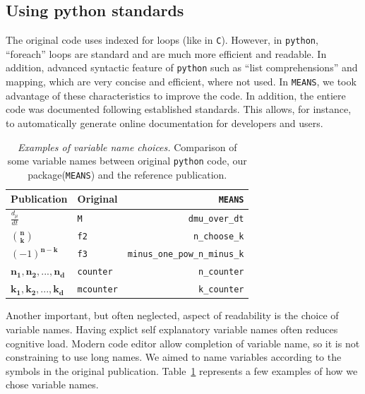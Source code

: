 \documentclass[11pt,a4paper]{article}
\newcommand{\means}{\texttt{MEANS}}
\newcommand{\py}{\texttt{python}}
\begin{document}
\subsection{Using python standards}
The original code uses indexed for loops (like in \texttt{C}).
However, in \py, ``foreach'' loops are  standard and are much more efficient and readable.
In addition, advanced syntactic feature of \py{} such as ``list comprehensions''  and mapping,
which are very concise and efficient, where not used.
In \means, we took advantage of these characteristics to improve the code.
In addition, the entiere code was documented following established standards.
This allows, for instance, to automatically generate online documentation for developers and users.



\begin{table}
\caption{\emph{Examples of variable name choices.}
Comparison of some  variable names between original \py{} code, our package(\means) and the reference publication.
}

\begin{center}   
	\begin{tabular}{ | l | l | r|}
	\hline
	\bf{Publication\cite{ale_general_2013}} & \bf{Original} & \bf{\means}\\
	\hline
	\hline
	$\frac{d_{\mu}}{dt}$ & \verb"M" & \verb"dmu_over_dt"\\
	\hline
	$\mathbf{n\choose{k}}$ & \verb"f2" & \verb"n_choose_k"\\
	\hline
	$ (-1)^\mathbf{{n-k}}$ & \verb"f3" & \verb"minus_one_pow_n_minus_k"\\
	\hline
	$\mathbf{n_1    , n_2, ..., n_d}$ & \verb"counter" & \verb"n_counter"\\
	\hline
	$\mathbf{k_1, k_2, ..., k_d}$ & \verb"mcounter" & \verb"k_counter"\\
	\hline
	\end{tabular}
\end{center}
\label{tab:varnames}
\end{table}

Another important, but often neglected, aspect of readability is the choice of variable names.
Having explict self explanatory variable names often reduces cognitive load.
Modern code editor allow completion of variable name, so it is not constraining to use long names.
We aimed to name variables according to the symbols in the original publication\cite{ale_general_2013}.
Table~\ref{tab:varnames} represents a few examples of how we chose variable names.
\end{document}

